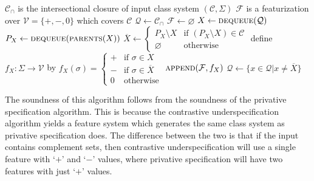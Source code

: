 \documentclass[11pt, oneside]{article}   	%
\begin{document}
\vspace{\baselineskip} \noindent \begin{algorithmic}
    \REQUIRE $\mathcal C_\cap$ is the intersectional closure of input class system $(\mathcal C, \Sigma)$
    \ENSURE $\mathcal F$ is a featurization over $\mathcal V = \{ +, -, 0 \}$ which covers $\mathcal C$
    \STATE
    \STATE $\mathcal Q \leftarrow \mathcal C_\cap$
    \STATE $\mathcal F \leftarrow \varnothing$
    \STATE
        \STATE $X \leftarrow \textsc{dequeue}(\mathcal Q)$
            \STATE $P_X \leftarrow \textsc{dequeue}(\textsc{parents}(X))$
            \STATE
            \STATE $\overline{X} \leftarrow \begin{cases}
                P_X \setminus X & \text{if } (P_X \setminus X) \in \mathcal C \\
                \varnothing     & \text{otherwise}
                \end{cases}$
            \STATE
            \STATE define $f_X : \Sigma \rightarrow \mathcal V$ by $f_X (\sigma) = \begin{cases}
                    + & \text{if } \sigma \in X \\
                    - & \text{if } \sigma \in \overline{X} \\
                    0 & \text{otherwise}
                    \end{cases}$
            \STATE $\textsc{append}(\mathcal F, f_X)$
            \STATE $\mathcal{Q} \leftarrow \{x \in \mathcal{Q} \vert x \neq \overline{X} \}$
        \ENDIF
    \ENDWHILE
\end{algorithmic}

\vspace{\baselineskip} \noindent The soundness of this algorithm follows from the soundness of the privative specification algorithm. This is because the contrastive underspecification algorithm yields a feature system which generates the same class system as privative specification does. The difference between the two is that if the input contains complement sets, then contrastive underspecification will use a single feature with `$+$' and `$-$' values, where privative specification will have two features with just `$+$' values.
\end{document}
